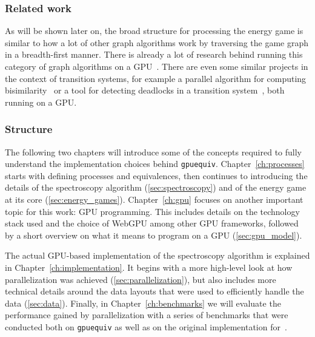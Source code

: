 \subsubsection{Related work}

As will be shown later on,
the broad structure for processing the energy game
is similar to how a lot of other graph algorithms work
by traversing the game graph in a breadth-first manner.
There is already a lot of research behind running this category of graph
algorithms on a GPU~\cite{Merrill2015,Busato2018,Hijma2023}.
There are even some similar projects in the context of transition systems,
for example a parallel algorithm for computing bisimilarity~\cite{Martens2023}
or a tool for detecting deadlocks in a transition system~\cite{Wijs2023},
both running on a GPU\@.

\subsubsection{Structure}

The following two chapters will introduce some of the concepts required to
fully understand the implementation choices behind \texttt{gpuequiv}.
Chapter~\ref{ch:processes} starts with defining processes and equivalences,
then continues to introducing the details of
the spectroscopy algorithm (\ref{sec:spectroscopy})
and of the energy game at its core (\ref{sec:energy_games}).
Chapter~\ref{ch:gpu} focuses on another important topic for this work:
GPU programming.
This includes details on the technology stack used
and the choice of WebGPU among other GPU frameworks,
followed by a short overview on what it means
to program on a GPU (\ref{sec:gpu_model}).

The actual GPU-based implementation of the spectroscopy algorithm is explained
in Chapter~\ref{ch:implementation}.
It begins with a more high-level look at how parallelization was achieved
(\ref{sec:parallelization}),
but also includes more technical details around the data layouts
that were used to efficiently handle the data (\ref{sec:data}).
Finally, in Chapter~\ref{ch:benchmarks} we will evaluate the performance
gained by parallelization with a series of benchmarks that were
conducted both on \texttt{gpuequiv} as well as on the original implementation
for~\cite{bisping2023process}.
